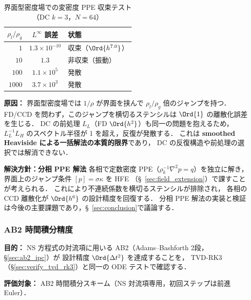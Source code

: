 \begin{table}[htbp]
\centering
\caption{界面型密度場での変密度 PPE 収束テスト（DC $k=3$，$N=64$）}
\label{tab:varrho_interface_divergence}
\renewcommand{\arraystretch}{1.2}
\begin{tabular}{rcl}
\toprule
$\rho_l/\rho_g$ & $L^\infty$ 誤差 & 状態 \\
\midrule
$1$    & $1.3 \times 10^{-10}$ & 収束（$\Ord{h^{7.0}}$） \\
$10$   & $1.3$                 & 非収束（振動） \\
$100$  & $1.1 \times 10^{5}$   & 発散 \\
$1000$ & $3.7 \times 10^{3}$   & 発散 \\
\bottomrule
\end{tabular}
\end{table}

\noindent\textbf{原因：}
界面型密度場では $1/\rho$ が界面を挟んで $\rho_l/\rho_g$ 倍のジャンプを持つ．
FD/CCD を問わず，このジャンプを横切るステンシルは $\Ord{1}$ の離散化誤差を生じる．
DC の前処理 $L_L$（FD $\Ord{h^2}$）も同一の問題を抱えるため，
$L_L^{-1}L_H$ のスペクトル半径が 1 を超え，反復が発散する．
これは \textbf{smoothed Heaviside による一括解法の本質的限界}であり，
DC の反復構造や前処理の選択では解消できない．

\noindent\textbf{解決方針：分相 PPE 解法}
各相で定数密度 PPE（$\rho_k^{-1}\nabla^2 p = q$）を独立に解き，
界面上のジャンプ条件 $[p] = \sigma\kappa$ を HFE
（§~\ref{sec:field_extension}）で課すことが考えられる．
これにより不連続係数を横切るステンシルが排除され，
各相の CCD 離散化が $\Ord{h^6}$ の設計精度を回復する．
分相 PPE 解法の実装と検証は今後の主要課題であり，§~\ref{sec:conclusion}で議論する．

\subsubsection{AB2 時間積分精度}
\label{sec:verify_ab2}

\noindent\textbf{目的：}
NS 方程式の対流項に用いる AB2（Adams--Bashforth 2段，§\ref{sec:ab2_ipc}）が
設計精度 $\Ord{\Delta t^2}$ を達成することを，
TVD-RK3（§\ref{sec:verify_tvd_rk3}）と同一の ODE テストで確認する．

\noindent\textbf{評価対象：}
AB2 時間積分スキーム（NS 対流項専用，初回ステップは前進 Euler）．

